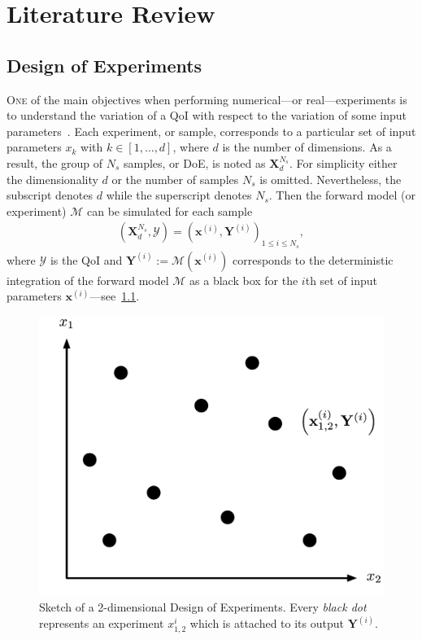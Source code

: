 \chapter{Literature Review}\label{chap:review}

\section{Design of Experiments}\label{sec:doe}

\lettrine{O}{ne} of the main objectives when performing numerical---or real---experiments is to understand the variation of a QoI with respect to the variation of some input parameters~\citep{Sacks1989}. Each experiment, or sample, corresponds to a particular set of input parameters $x_k$ with $k \in [1, \dots , d]$, where $d$ is the number of dimensions. As a result, the group of $N_s$ samples, or DoE, is noted as $\mathbf{X}^{N_s}_d$. For simplicity either the dimensionality $d$ or the number of samples $N_s$ is omitted. Nevertheless, the subscript denotes $d$ while the superscript denotes $N_s$. Then the forward model (or experiment) $\mathcal{M}$ can be simulated for each sample
\begin{align}
(\mathbf{X}^{N_s}_d, \mathcal{Y})=\left(\mathbf{x}^{(i)},\mathbf{Y}^{(i)}\right)_{1\leq i\leq N_{s}},
\end{align}
\noindent where $\mathcal{Y}$ is the QoI and $\mathbf{Y}^{(i)} := \mathcal{M}(\mathbf{x}^{(i)})$ corresponds to the deterministic integration of the forward model $\mathcal{M}$ as a black box for the $i$th set of input parameters $\mathbf{x}^{(i)}$---see~\cref{fig:doe}.

\begin{figure}[!ht]
\centering
\includegraphics[width=0.5\linewidth,keepaspectratio]{fig/literature/doe.pdf}
\caption{Sketch of a 2-dimensional Design of Experiments. Every \emph{black dot} represents an experiment $x_{1, 2}^i$ which is attached to its output $\mathbf{Y}^{(i)}$.}
\label{fig:doe}
\end{figure}

